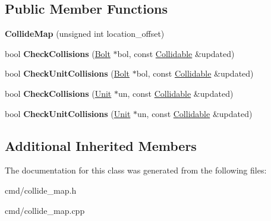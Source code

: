 \subsection*{Public Member Functions}
\begin{DoxyCompactItemize}
\item 
{\bfseries Collide\+Map} (unsigned int location\+\_\+offset)\hypertarget{classCollideMap_a3329d7cc3cb4c04860f7519384b925fb}{}\label{classCollideMap_a3329d7cc3cb4c04860f7519384b925fb}

\item 
bool {\bfseries Check\+Collisions} (\hyperlink{classBolt}{Bolt} $\ast$bol, const \hyperlink{classCollidable}{Collidable} \&updated)\hypertarget{classCollideMap_acd7f43c625de77c1addb57cab48e3ff3}{}\label{classCollideMap_acd7f43c625de77c1addb57cab48e3ff3}

\item 
bool {\bfseries Check\+Unit\+Collisions} (\hyperlink{classBolt}{Bolt} $\ast$bol, const \hyperlink{classCollidable}{Collidable} \&updated)\hypertarget{classCollideMap_a5f85066e79b3b56fc59a9445fc5c11b1}{}\label{classCollideMap_a5f85066e79b3b56fc59a9445fc5c11b1}

\item 
bool {\bfseries Check\+Collisions} (\hyperlink{classUnit}{Unit} $\ast$un, const \hyperlink{classCollidable}{Collidable} \&updated)\hypertarget{classCollideMap_a594d554b9807c7742d329c3fc20ba618}{}\label{classCollideMap_a594d554b9807c7742d329c3fc20ba618}

\item 
bool {\bfseries Check\+Unit\+Collisions} (\hyperlink{classUnit}{Unit} $\ast$un, const \hyperlink{classCollidable}{Collidable} \&updated)\hypertarget{classCollideMap_aa08f168c2f4e3f3c5e7f614e2663e481}{}\label{classCollideMap_aa08f168c2f4e3f3c5e7f614e2663e481}

\end{DoxyCompactItemize}
\subsection*{Additional Inherited Members}


The documentation for this class was generated from the following files\+:\begin{DoxyCompactItemize}
\item 
cmd/collide\+\_\+map.\+h\item 
cmd/collide\+\_\+map.\+cpp\end{DoxyCompactItemize}
